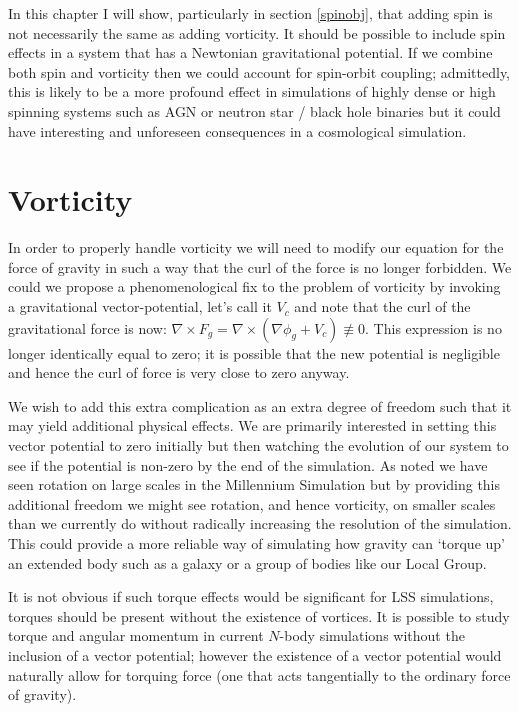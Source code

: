 In this chapter I will show, particularly in section \ref{spinobj}, that adding spin is not necessarily the same as adding vorticity. It should be possible to include spin effects in a system that has a Newtonian gravitational potential. If we combine both spin and vorticity then we could account for spin-orbit coupling; admittedly, this is likely to be a more profound effect in simulations of highly dense or high spinning systems such as AGN or neutron star / black hole binaries but it could have interesting and unforeseen consequences in a cosmological simulation.

\section{Vorticity}
In order to properly handle vorticity we will need to modify our equation for the force of gravity in such a way that the curl of the force is no longer forbidden. We could we propose a phenomenological fix to the problem of vorticity by invoking a gravitational vector-potential, let's call it $V_c$ and note that the curl of the gravitational force is now: $\nabla\times F_g = \nabla\times(\nabla\phi_g + V_c) \not\equiv 0$. This expression is no longer identically equal to zero; it is possible that the new potential is negligible and hence the curl of force is very close to zero anyway.

We wish to add this extra complication as an extra degree of freedom such that it may yield additional physical effects. We are primarily interested in setting this vector potential to zero initially but then watching the evolution of our system to see if the potential is non-zero by the end of the simulation. As noted we have seen rotation on large scales in the Millennium Simulation \citep{bib_mil} but by providing this additional freedom we might see rotation, and hence vorticity, on smaller scales than we currently do without radically increasing the resolution of the simulation. This could provide a more reliable way of simulating how gravity can `torque up' an extended body such as a galaxy or a group of bodies like our Local Group.

It is not obvious if such torque effects would be significant for LSS simulations, torques should be present without the existence of vortices. It is possible to study torque and angular momentum in current $N$-body simulations without the inclusion of a vector potential; however the existence of a vector potential would naturally allow for torquing force (one that acts tangentially to the ordinary force of gravity).

